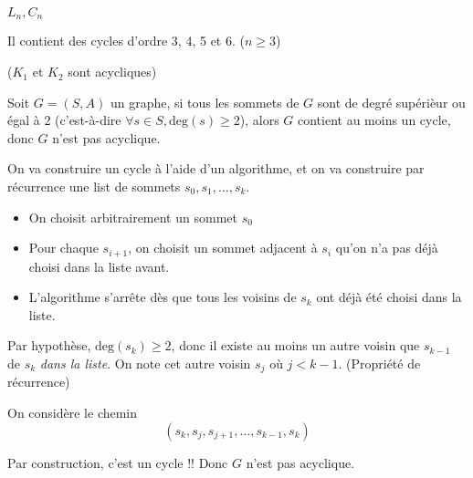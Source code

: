 \begin{Example}{$L_n, C_n$}{}
      
  \begin{center}
  \end{center}

  Il contient des cycles d'ordre 3, 4, 5 et 6. ($n \ge 3$) 

  ($K_1$ et $K_2$ sont acycliques)
  \end{Example}

  \begin{Prop}{}{}
  Soit $G = (S,A)$ un graphe, si tous les sommets de $G$ sont de degré supérièur ou égal à 2 (c'est-à-dire $\forall  s \in S, \mathrm{deg}(s) \ge  2$), alors $G$ contient au moins un cycle, donc $G$ n'est pas acyclique.
  \end{Prop}

  \begin{myproof}
  On va construire un cycle à l'aide d'un algorithme, et on va construire par récurrence une list de sommets $s_0, s_1, \ldots, s_k$.

  \begin{itemize}
      \item On choisit arbitrairement un sommet $s_0$
      \item Pour chaque $s_{i+1}$, on choisit un sommet adjacent à $s_i$ qu'on n'a pas déjà choisi dans la liste avant.
      \item L'algorithme s'arrête dès que tous les voisins de $s_k$ ont déjà été choisi dans la liste.
  \end{itemize}

  Par hypothèse, $\mathrm{deg} (s_k) \ge 2$, donc il existe au moins un autre voisin que $s_{k-1}$ de $s_k$ \textit{dans la liste}. On note cet autre voisin $s_j$ où  $j <k-1$. (Propriété de récurrence)

  On considère le chemin \[
      (s_k, s_j, s_{j+1},\ldots, s_{k-1}, s_k)
  \]

  Par construction, c'est un cycle !! Donc $G$ n'est pas acyclique.
  \end{myproof}  


